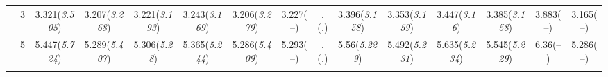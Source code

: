 \documentclass{article}
\begin{document}
\begin{table}[tbp]
{\begin{tabularx}{\textwidth}{lCCCCCCCCCCCCCC}
&3&3.321\newline (\emph{3.505})&3.207\newline (\emph{3.268})&3.221\newline (\emph{3.193})&3.243\newline (\emph{3.169})&3.206\newline (\emph{3.279})&3.227\newline (--)&.\newline (\emph{.})&3.396\newline (\emph{3.158})&3.353\newline (\emph{3.159})&3.447\newline (\emph{3.16})&3.385\newline (\emph{3.158})&3.883\newline (--)&3.165\newline (--) \tabularnewline
&5&5.447\newline (\emph{5.724})&5.289\newline (\emph{5.407})&5.306\newline (\emph{5.28})&5.365\newline (\emph{5.244})&5.286\newline (\emph{5.409})&5.293\newline (--)&.\newline (\emph{.})&5.56\newline (\emph{5.229})&5.492\newline (\emph{5.231})&5.635\newline (\emph{5.234})&5.545\newline (\emph{5.229})&6.36\newline (--)&5.286\newline (--) \tabularnewline
\bottomrule \addlinespace[1.5ex]

\end{tabularx}
}
\end{table}
\end{document}
